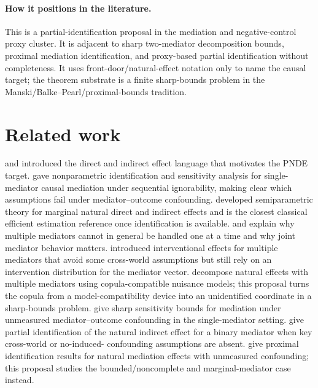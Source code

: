 \documentclass[11pt]{article}
\theoremstyle{definition}
\theoremstyle{plain}
\theoremstyle{remark}
\begin{document}
\paragraph{How it positions in the literature.}
This is a partial-identification proposal in the mediation and negative-control
proxy cluster.  It is adjacent to sharp two-mediator decomposition bounds,
proximal mediation identification, and proxy-based partial identification
without completeness.  It uses front-door/natural-effect notation only to name
the causal target; the theorem substrate is a finite sharp-bounds problem in
the Manski/Balke--Pearl/proximal-bounds tradition.

\section{Related work}
\citet{RobinsGreenland1992} and \citet{Pearl2001} introduced the direct and
indirect effect language that motivates the PNDE target.
\citet{ImaiKeeleYamamoto2010} gave nonparametric identification and
sensitivity analysis for single-mediator causal mediation under sequential
ignorability, making clear which assumptions fail under mediator--outcome
confounding.
\citet{TchetgenShpitser2012} developed semiparametric theory for marginal
natural direct and indirect effects and is the closest classical efficient
estimation reference once identification is available.
\citet{DanielDeStavolaCousensVansteelandt2015} and
\citet{VanderWeeleVansteelandt2014} explain why multiple mediators cannot in
general be handled one at a time and why joint mediator behavior matters.
\citet{VansteelandtDaniel2017} introduced interventional effects for multiple
mediators that avoid some cross-world assumptions but still rely on an
intervention distribution for the mediator vector.
\citet{XiaChan2022} decompose natural effects with multiple mediators using
copula-compatible nuisance models; this proposal turns the copula from a
model-compatibility device into an unidentified coordinate in a sharp-bounds
problem.
\citet{DingVanderWeele2016} give sharp sensitivity bounds for mediation under
unmeasured mediator--outcome confounding in the single-mediator setting.
\citet{MilesKankiMeloniTchetgen2017} give partial identification of the natural
indirect effect for a binary mediator when key cross-world or no-induced-
confounding assumptions are absent.
\citet{DukesShpitserTchetgen2023} give proximal identification results for
natural mediation effects with unmeasured confounding; this proposal studies
the bounded/noncomplete and marginal-mediator case instead.
\end{document}
